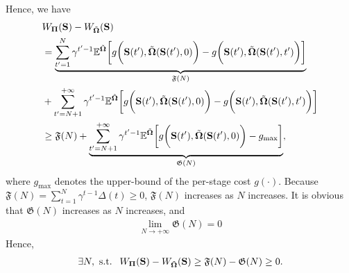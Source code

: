 Hence, we have
{\small
\begin{align*}
&W_{\boldsymbol{\Pi}}(\mathbf{S})- W_{\tilde{\boldsymbol{\Omega}}}(\mathbf{S})\\
&= 
\underbrace{\sum_{t'=1}^{N} \gamma^{t'-1} \mathbb{E}^{ \tilde{\boldsymbol{\Omega}} } \bigg[
	g\bigg(\mathbf{S}(t'), \tilde{\boldsymbol{\Omega}}(\mathbf{S}(t'),0)\bigg)
	- 	g\bigg(\mathbf{S}(t'), \tilde{\boldsymbol{\Omega}}(\mathbf{S}(t'),t')\bigg)
\bigg]}_{\mathfrak{F}(N)}\\
&+\sum_{t'=N+1}^{+\infty} \gamma^{t'-1} \mathbb{E}^{ \tilde{\boldsymbol{\Omega}} } \bigg[
	g\bigg(\mathbf{S}(t'), \tilde{\boldsymbol{\Omega}}(\mathbf{S}(t'),0)\bigg)
	- 	g\bigg(\mathbf{S}(t'), \tilde{\boldsymbol{\Omega}}(\mathbf{S}(t'),t')\bigg)
\bigg]\\
&\geq \mathfrak{F}(N) + \underbrace{\sum_{t'=N+1}^{+\infty} \gamma^{t'-1} \mathbb{E}^{ \tilde{\boldsymbol{\Omega}} } \bigg[
	g\bigg(\mathbf{S}(t'), \tilde{\boldsymbol{\Omega}}(\mathbf{S}(t'),0)\bigg)
	- 	g_{\max}
\bigg]}_{\mathfrak{G}(N)},
\end{align*}
}where $g_{\max}$ denotes the upper-bound of the per-stage cost $g(\cdot)$.
Because  $\mathfrak{F}(N)=\sum_{t=1}^{N}\gamma^{t-1}\Delta(t)\geq 0$, $\mathfrak{F}(N)$ increases as $N$ increases.
It is obvious that $\mathfrak{G}(N)$ increases as $N$ increases, and 
\begin{align*}
\lim\limits_{N\to+\infty}\mathfrak{G}(N)=0
\end{align*}
Hence, 
\begin{align*}
\exists N,\ \mbox{s.t. }\ W_{\boldsymbol{\Pi}}(\mathbf{S})- W_{\tilde{\boldsymbol{\Omega}}}(\mathbf{S})\geq \mathfrak{F}(N)-\mathfrak{G}(N) \geq 0.
\end{align*}

